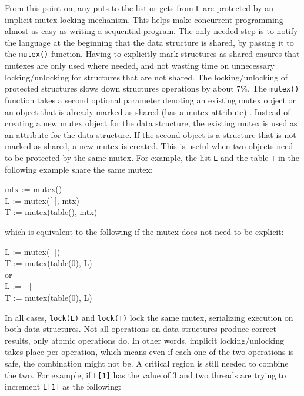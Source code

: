 
\noindent
From this point on, any puts to the list or gets from \texttt{L} are
protected by an implicit mutex locking mechanism. This helps make
concurrent programming almost as easy as writing a sequential program.  The
only needed step is to notify the language at the beginning that the data
structure is shared, by passing it to the \texttt{mutex()} function. Having
to explicitly mark structures as shared ensures that mutexes are only used
where needed, and not wasting time on unnecessary locking/unlocking for
structures that are not shared. The locking/unlocking of protected
structures slows down structures operations by about 7\%. The
\texttt{mutex()} function takes a second optional parameter denoting an
existing mutex object or an object that is already marked as shared (has a
mutex attribute) . Instead of creating a new mutex object for the data
structure, the existing mutex is used as an attribute for the data
structure. If the second object is a structure that is not marked as
shared, a new mutex is created. This is useful when two objects need to be
protected by the same mutex. For example, the list \texttt{L} and the table
\texttt{T} in the following example share the same mutex:

\begin{iconcode}
\>mtx := mutex()\\
\>L := mutex([ ], mtx)\\
\>T := mutex(table(), mtx)\\
\end{iconcode}

\noindent
which is equivalent to the following if the mutex does not need to be explicit:

\begin{iconcode}
\>L := mutex([ ])\\
\>T := mutex(table(0), L)\\
{\textnormal {or}}\\
\>L := [ ]\\
\>T := mutex(table(0), L)\\
\end{iconcode}

In all cases, \texttt{lock(L)} and \texttt{lock(T)} lock the same mutex,
serializing execution on both data structures.  Not all operations on data
structures produce correct results, only atomic operations do. In other
words, implicit locking/unlocking takes place per operation, which means
even if each one of the two operations is safe, the combination might not
be. A critical region is still needed to combine the two.  For example, if
\texttt{L[1]} has the value of 3 and two threads are trying to increment
\texttt{L[1]} as the following:

